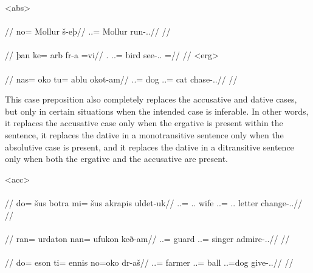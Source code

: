 	\a<abs>\begingl
		\glpreamble{}\\
		\\
		//
		\gla no= Mollur š-eþ//
		\glb \An.\Sg.\Top= Mollur run-\Ind.\Npst.\Prg//
		\glft{}//
	\endgl
	\a<abs-tr>\begingl
		\glpreamble{}\\
		\\
		//
		\gla þan ke= arb fr-a =vi//
		\glb \Sps.\Top{} \An.\Sg.\Dat= bird see-\Ind.\Npst.\Ipfv{} =\Q//
		\glft{}//
	\endgl
	\a<erg>\begingl
		\glpreamble{}\\
		\\
		//
		\gla nas= oko tu= ablu okot-am//
		\glb \An.\Pc.\Top= dog \An.\Sg.\Acc= cat chase-\Ind.\Pst.\Ipfv//
		\glft{}//
	\endgl
\xe

This case preposition also completely replaces the accusative and dative cases, but only in certain situations when the intended case is inferable. In other words, it replaces the accusative case only when the ergative is present within the sentence, it replaces the dative in a monotransitive sentence only when the absolutive case is present, and it replaces the dative in a ditransitive sentence only when both the ergative and the accusative are present.

	\a<acc>\begingl
		\glpreamble{}\\
		\\
		//
		\gla do= šus botra mi= šus akrapis uldet-uk//
		\glb \An.\Sg.\Erg= \Tpp.\An.\Gen{} wife \In.\Sg.\Top= \Tpp.\An.\Gen{} letter change-\Ind.\Pst.\Pfv//
		\glft{}//
	\endgl
	\a<dat-st>\begingl
		\glpreamble{}\\
		\\
		//
		\gla ran= urdaton nan= ufukon keð-am//
		\glb \An.\Pl.\Abs= guard \An.\Pl.\Top= singer admire-\Ind.\Pst.\Ipfv//
		\glft{}//
	\endgl
	\a<dat-ac>\begingl
		\glpreamble{}\\
		\\
		//
		\gla do= eson ti= ennis no=oko dr-aš//
		\glb \An.\Sg.\Erg= farmer \In.\Sg.\Acc= ball \An.\Sg.\Top=dog give-\Ind.\Npst.\Rtsp//
		\glft{}//
	\endgl
\xe

